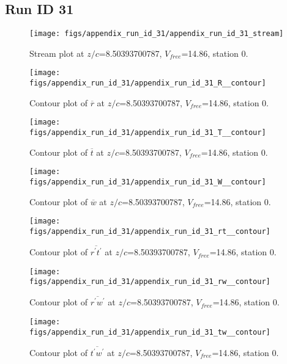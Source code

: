 \subsection{Run ID 31}
\begin{figure}[H]
\centering
\texttt{[image: figs/appendix\_run\_id\_31/appendix\_run\_id\_31\_stream]}
\caption{Stream plot at $z/c$=8.50393700787, $V_{free}$=14.86, station 0.}
\label{fig:appendix_run_id_31_stream}
\end{figure}


\begin{figure}[H]
\centering
\texttt{[image: figs/appendix\_run\_id\_31/appendix\_run\_id\_31\_R\_\_contour]}
\caption{Contour plot of $\overline{r}$ at $z/c$=8.50393700787, $V_{free}$=14.86, station 0.}
\label{fig:appendix_run_id_31_R__contour}
\end{figure}


\begin{figure}[H]
\centering
\texttt{[image: figs/appendix\_run\_id\_31/appendix\_run\_id\_31\_T\_\_contour]}
\caption{Contour plot of $\overline{t}$ at $z/c$=8.50393700787, $V_{free}$=14.86, station 0.}
\label{fig:appendix_run_id_31_T__contour}
\end{figure}


\begin{figure}[H]
\centering
\texttt{[image: figs/appendix\_run\_id\_31/appendix\_run\_id\_31\_W\_\_contour]}
\caption{Contour plot of $\overline{w}$ at $z/c$=8.50393700787, $V_{free}$=14.86, station 0.}
\label{fig:appendix_run_id_31_W__contour}
\end{figure}


\begin{figure}[H]
\centering
\texttt{[image: figs/appendix\_run\_id\_31/appendix\_run\_id\_31\_rt\_\_contour]}
\caption{Contour plot of $\overline{r^\prime t^\prime}$ at $z/c$=8.50393700787, $V_{free}$=14.86, station 0.}
\label{fig:appendix_run_id_31_rt__contour}
\end{figure}


\begin{figure}[H]
\centering
\texttt{[image: figs/appendix\_run\_id\_31/appendix\_run\_id\_31\_rw\_\_contour]}
\caption{Contour plot of $\overline{r^\prime w^\prime}$ at $z/c$=8.50393700787, $V_{free}$=14.86, station 0.}
\label{fig:appendix_run_id_31_rw__contour}
\end{figure}


\begin{figure}[H]
\centering
\texttt{[image: figs/appendix\_run\_id\_31/appendix\_run\_id\_31\_tw\_\_contour]}
\caption{Contour plot of $\overline{t^\prime w^\prime}$ at $z/c$=8.50393700787, $V_{free}$=14.86, station 0.}
\label{fig:appendix_run_id_31_tw__contour}
\end{figure}


